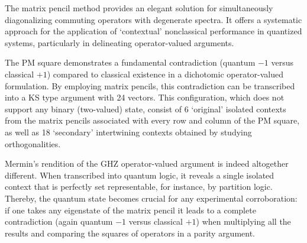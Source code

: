 \documentclass[
  twocolumn,
 showpacs,
 showkeys,
 preprintnumbers,
 amsmath,amssymb,
 aps,
 prl,
  longbibliography,
 floatfix,
 ]{revtex4-2}
\newcommand\myotimes{ }
\begin{document}
%

The matrix pencil method provides an elegant solution for simultaneously diagonalizing commuting operators with degenerate spectra.
It offers a systematic approach for the application of `contextual' nonclassical performance in quantized systems, particularly in delineating operator-valued arguments.

The PM square demonstrates a fundamental contradiction (quantum $-1$ versus classical $+1$) compared to classical existence in a dichotomic operator-valued formulation.
By employing matrix pencils, this contradiction can be transcribed into a KS type argument with 24 vectors.
This configuration,
which does not support any  binary (two-valued) state,
consist of 6 `original' isolated contexts from the matrix pencils associated with every row and column of the PM square, as well as 18 `secondary' intertwining contexts obtained by studying orthogonalities.

Mermin's rendition of the GHZ operator-valued argument is indeed altogether different.
When transcribed into quantum logic, it reveals a single isolated context that is perfectly set representable, for instance, by partition logic.
Thereby, the quantum state becomes crucial for any experimental corroboration:
if one takes any eigenstate of the matrix pencil it leads to a complete contradiction  (again quantum $-1$ versus classical $+1$)
when multiplying all the results and comparing the squares of operators in a parity argument.
\end{document}
